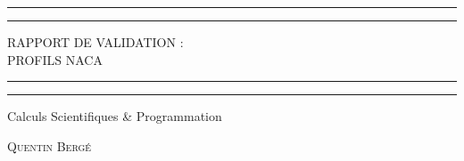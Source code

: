\documentclass[a4paper,oneside]{article}
\begin{document}


\begin{titlepage} %

	\centering %

	\scshape %

	\vspace*{\baselineskip} %


	\rule{\textwidth}{1.6pt}\vspace*{-\baselineskip}\vspace*{2pt}
	\rule{\textwidth}{0.4pt} %

	\vspace{0.75\baselineskip} %

	{\LARGE RAPPORT DE VALIDATION :\\ PROFILS NACA\\} %

	\vspace{0.75\baselineskip} %
	\rule{\textwidth}{0.4pt}\vspace*{-\baselineskip}\vspace*{3.2pt}
	\rule{\textwidth}{1.6pt} %
	\vspace{2\baselineskip} %


	Calculs Scientifiques \& Programmation

	\vspace*{3\baselineskip} %



	\vspace{0.5\baselineskip} %

	{\scshape\Large Quentin Bergé } %

	\vspace{0.5\baselineskip} %


\end{titlepage}
\end{document}
